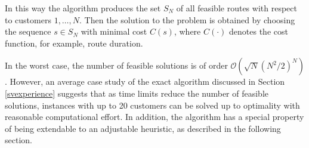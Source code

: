 \documentclass[dissertation,draft*]{aaltoseries}
\begin{document}

In this way the algorithm 
produces the set $S_N$ of all feasible routes with respect to customers $1,\ldots,N$. 
Then the solution to the problem is obtained by choosing the sequence $s \in S_N$ with
minimal cost $C(s)$, where $C(\cdot)$ denotes the cost function, for example, route duration. 

In the worst case, the number of feasible solutions is of order $\mathcal{O}(\sqrt{N} (N^2/2)^N)$.
However, an average case study of the exact algorithm discussed in Section \ref{svexperience} suggests 
that as time limits reduce the number of feasible solutions, instances with up to 20 customers 
can be solved up to optimality with reasonable computational effort.
In addition, the 
algorithm has a special property of being extendable to an adjustable heuristic,
as described in the following section.
\end{document}
